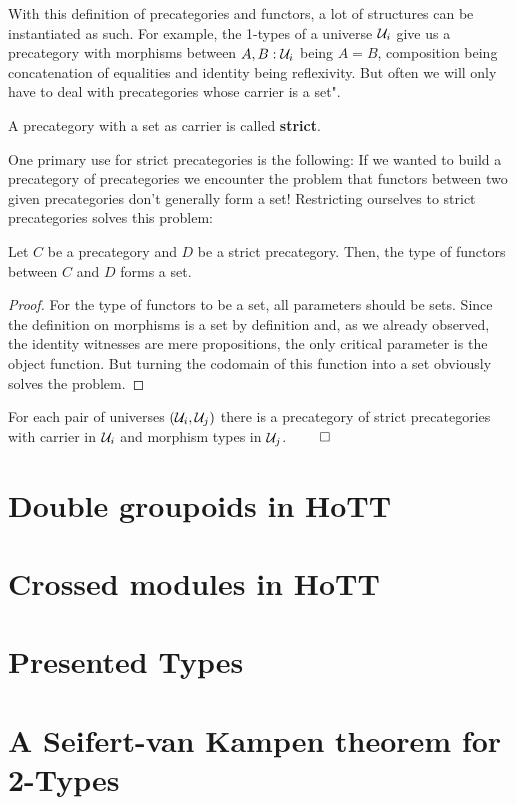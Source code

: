 With this definition of precategories and functors, a lot of structures can be
instantiated as such.
For example, the 1-types of a universe $\mathcal{U}_i$ give us a precategory with morphisms
between $A, B : \mathcal{U}_i$ being $A = B$, composition being concatenation of equalities
and identity being reflexivity.
But often we will only have to deal with precategories whose carrier is a set".

\begin{defn} \label{def:hott-strict-precat}
A precategory with a set as carrier is called \textbf{strict}.
\end{defn}

One primary use for strict precategories is the following:
If we wanted to build a precategory of precategories we encounter the problem that
functors between two given precategories don't generally form a set!
Restricting ourselves to strict precategories solves this problem:

\begin{lemma}
Let $C$ be a precategory and $D$ be a strict precategory.
Then, the type of functors between $C$ and $D$ forms a set.
\end{lemma}

\begin{proof}
For the type of functors to be a set, all parameters should be sets.
Since the definition on morphisms is a set by definition and,
as we already observed, the identity witnesses are mere propositions,
the only critical parameter is the object function.
But turning the codomain of this function into a set obviously solves the
problem.
\end{proof}

\begin{corollary}
For each pair of universes $(\mathcal{U}_i, \mathcal{U}_j)$ there is a precategory of strict
precategories with carrier in $\mathcal{U}_i$ and morphism types in $\mathcal{U}_j$. \hfill $\qed$
\end{corollary}

\section{Double groupoids in HoTT}

\section{Crossed modules in HoTT}

\section{Presented Types}

\section{A Seifert-van Kampen theorem for 2-Types}

